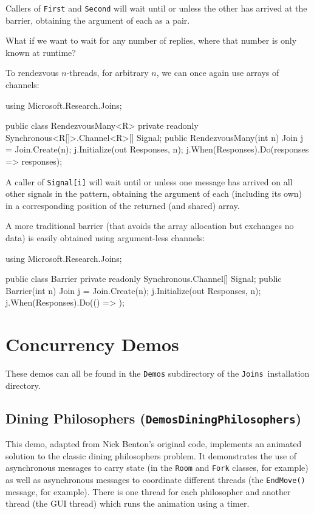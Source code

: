 \documentclass{article}
\newcommand{\demo}[1]{\texorpdfstring{{(\texttt{Demos{\symbol{92}}#1})}}{}}
\newcommand{\joins}{{\texttt{Joins}}}
\begin{document}
Callers of \texttt{First} and \texttt{Second} will wait until or unless the other has arrived at the barrier, obtaining the argument of each as a pair.

What if we want to wait for  any number of replies, where that number is only known at runtime?

To rendezvous $n$-threads, for arbitrary $n$, we can once again use arrays of channels:

\begin{lstcsharp}
using Microsoft.Research.Joins;

public class RendezvousMany<R> {
  private readonly Synchronous<R[]>.Channel<R>[] Signal;
  public RendezvousMany(int n) {
    Join j = Join.Create(n);
    j.Initialize(out Responses, n);
    j.When(Responses).Do(responses => responses);
  }
}
\end{lstcsharp}

A caller of \texttt{Signal[i]} will wait until or unless one message has arrived on all other signals in the pattern, 
obtaining the argument of each (including its own) in a corresponding position of the returned (and shared) array.

A more traditional barrier (that avoids the array allocation but exchanges no data) is easily obtained using argument-less channels:

\begin{lstcsharp}
using Microsoft.Research.Joins;

public class Barrier {
  private readonly Synchronous.Channel[] Signal;
  public Barrier(int n) {
    Join j = Join.Create(n);
    j.Initialize(out Responses, n);
    j.When(Responses).Do(() => {});
  }
}
\end{lstcsharp}


\section{Concurrency Demos}\label{demos}

These demos can all be found in the \texttt{Demos} subdirectory of the
\joins\ installation directory.

\subsection{Dining Philosophers \demo{DiningPhilosophers}}
This demo, adapted from Nick Benton's original code, implements an animated solution to the
classic dining philosophers problem. It demonstrates the use of
asynchronous messages to carry state (in the \texttt{Room} and
\texttt{Fork} classes, for example) as well as asynchronous messages
to coordinate different threads (the \texttt{EndMove()} message, for
example). There is one thread for each philosopher and another thread
(the GUI thread) which runs the animation using a timer.
\end{document}
